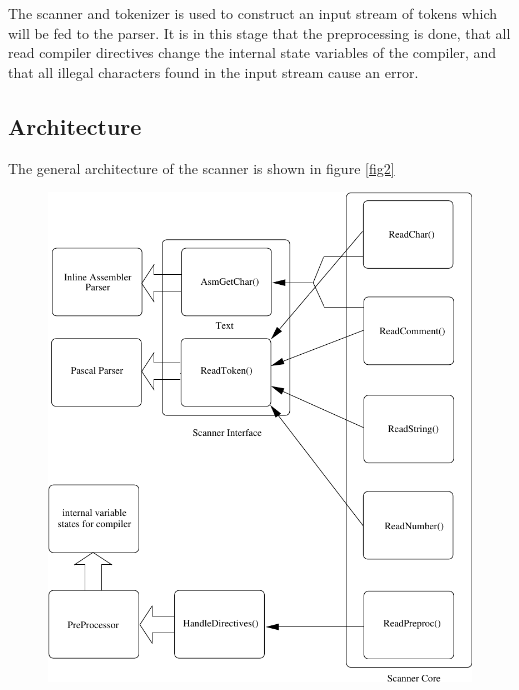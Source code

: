 \documentclass [a4paper,12pt]{article}
\begin{document}
The scanner and tokenizer is used to construct an input stream of tokens
which will be fed to the parser. It is in this stage that the preprocessing
is done, that all read compiler directives change the internal state
variables of the compiler, and that all illegal characters found in the
input stream cause an error.

\subsection{Architecture}
\label{subsec:architectureand}

The general architecture of the scanner is shown in figure \ref{fig2}

\begin{figure}
\ifpdf
\includegraphics{arch2.pdf}
\else

\end{figure}
\end{document}
